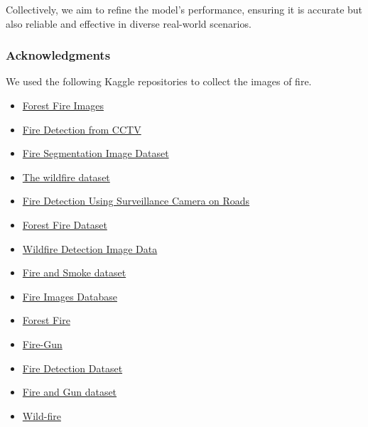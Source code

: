Collectively, we aim to refine the model's performance, ensuring it is accurate but also reliable and effective in diverse real-world scenarios.





\subsubsection*{Acknowledgments}

We used the following Kaggle repositories to collect the images of fire.

\begin{itemize}
	\item \href{https://www.kaggle.com/datasets/mohnishsaiprasad/forest-fire-images}{Forest Fire Images}
	\item \href{https://www.kaggle.com/datasets/ritupande/fire-detection-from-cctv}{Fire Detection from CCTV}
	\item \href{https://www.kaggle.com/datasets/diversisai/fire-segmentation-image-dataset}{Fire Segmentation Image Dataset}
	\item \href{https://www.kaggle.com/datasets/elmadafri/the-wildfire-dataset}{The wildfire dataset}
	\item \href{https://www.kaggle.com/datasets/tharakan684/urecamain}{Fire Detection Using Surveillance Camera on Roads}
	\item \href{https://www.kaggle.com/datasets/alik05/forest-fire-dataset}{Forest Fire Dataset}
	\item \href{https://www.kaggle.com/datasets/brsdincer/wildfire-detection-image-data}{Wildfire Detection Image Data}
	\item \href{https://www.kaggle.com/datasets/ashutosh69/fire-and-smoke-dataset}{Fire and Smoke dataset}
	\item \href{https://www.kaggle.com/datasets/gondimjoaom/fire-images-database}{Fire Images Database}
	\item \href{https://www.kaggle.com/datasets/arbethi/forest-fire}{Forest Fire}
	\item \href{https://www.kaggle.com/datasets/parthmehta15/fire-gun}{Fire-Gun}
	\item \href{https://www.kaggle.com/datasets/christofel04/fire-detection-dataset}{Fire Detection Dataset}
	\item \href{https://www.kaggle.com/datasets/atulyakumar98/fire-and-gun-dataset}{Fire and Gun dataset}
	\item \href{https://www.kaggle.com/datasets/ashukr/wildfire}{Wild-fire}

\end{itemize}
